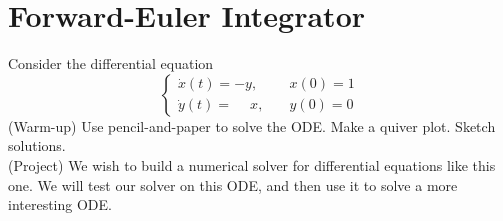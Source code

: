 
\section{Forward-Euler Integrator}
Consider the differential equation
\begin{equation}
\label{eq:ode_system}
\begin{cases} \dot{x}(t) = -y, & \quad x(0) = 1\\ \dot{y}(t) = \phantom{-}x, & \quad y(0) = 0 \end{cases}
\end{equation}
(Warm-up) Use pencil-and-paper to solve the ODE. Make a quiver plot. Sketch solutions.\\
(Project) We wish to build a numerical solver for differential equations like this one. We will test our solver on this ODE, and then use it to solve a more interesting ODE.

